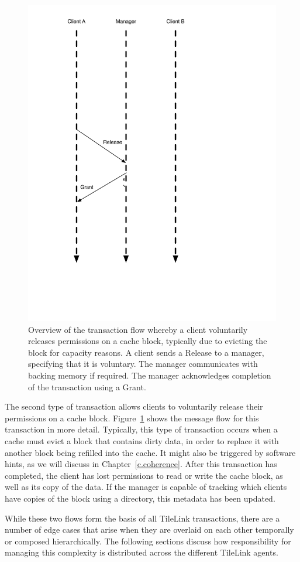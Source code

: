 \begin{figure}[t!]
\centering
\includegraphics[width=0.5\columnwidth]{tilelink/figures/volwb.pdf}
\caption[Transaction flow to Release permissions on a cache block.]{
Overview of the transaction flow whereby a client voluntarily releases permissions on a cache block,
typically due to evicting the block for capacity reasons.
A client sends a Release to a manager, specifying that it is voluntary.
The manager communicates with backing memory if required.
The manager acknowledges completion of the transaction using a Grant.
}
\label{fig:volwb}
\end{figure}

The second type of transaction allows clients to voluntarily release their permissions on a cache block.
Figure~\ref{fig:volwb} shows the message flow for this transaction in more detail.
Typically, this type of transaction occurs when a cache must evict a block that contains dirty data, in order to replace it
with another block being refilled into the cache.
It might also be triggered by software hints, as we will discuss in Chapter~\ref{c.coherence}.
After this transaction has completed, the client has lost permissions to read or write the cache block, as well as its copy of the data.
If the manager is capable of tracking which clients have copies of the block using a directory, this metadata has been updated.

While these two flows form the basis of all TileLink transactions, there are a number of edge cases that arise when
they are overlaid on each other temporally or composed hierarchically.
The following sections discuss how responsibility for managing this complexity is distributed across the different TileLink agents.

